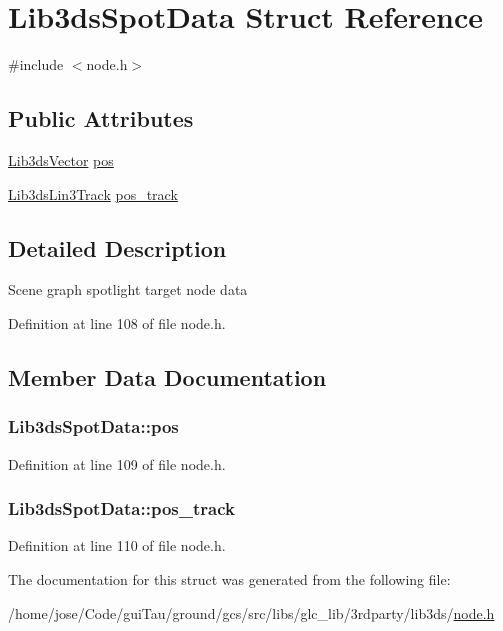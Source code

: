 \hypertarget{struct_lib3ds_spot_data}{\section{Lib3ds\-Spot\-Data Struct Reference}
\label{struct_lib3ds_spot_data}
}


{\ttfamily \#include $<$node.\-h$>$}

\subsection*{Public Attributes}
\begin{DoxyCompactItemize}
\item 
\hyperlink{group__vector_ga6ac1c3b3ef15381ebf6baf264d658dcf}{Lib3ds\-Vector} \hyperlink{struct_lib3ds_spot_data_acc1fe26c397582fa282cab8d2ca511b7}{pos}
\item 
\hyperlink{struct_lib3ds_lin3_track}{Lib3ds\-Lin3\-Track} \hyperlink{struct_lib3ds_spot_data_adcc14e49e8dd893b41376097f658716c}{pos\-\_\-track}
\end{DoxyCompactItemize}


\subsection{Detailed Description}
Scene graph spotlight target node data 

Definition at line 108 of file node.\-h.



\subsection{Member Data Documentation}
\hypertarget{struct_lib3ds_spot_data_acc1fe26c397582fa282cab8d2ca511b7}{
\subsubsection[{pos}]{ Lib3ds\-Spot\-Data\-::pos}}\label{struct_lib3ds_spot_data_acc1fe26c397582fa282cab8d2ca511b7}


Definition at line 109 of file node.\-h.

\hypertarget{struct_lib3ds_spot_data_adcc14e49e8dd893b41376097f658716c}{
\subsubsection[{pos\-\_\-track}]{ Lib3ds\-Spot\-Data\-::pos\-\_\-track}}\label{struct_lib3ds_spot_data_adcc14e49e8dd893b41376097f658716c}


Definition at line 110 of file node.\-h.



The documentation for this struct was generated from the following file\-:\begin{DoxyCompactItemize}
\item 
/home/jose/\-Code/gui\-Tau/ground/gcs/src/libs/glc\-\_\-lib/3rdparty/lib3ds/\hyperlink{node_8h}{node.\-h}\end{DoxyCompactItemize}
